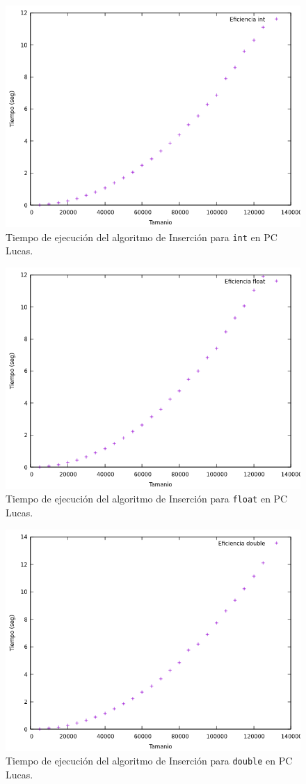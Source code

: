 \documentclass[12pt]{article}
\begin{document}
    \begin{figure}
        \centering
        \includegraphics[width=0.8\linewidth]{images/Insercion/insercion_int_graf.png}
        \cprotect\caption{Tiempo de ejecución del algoritmo de Inserción para \verb|int| en PC Lucas.}
        \label{fig:Inserción_int_graf}
    \end{figure}
    \begin{figure}
        \centering
        \includegraphics[width=0.8\linewidth]{images/Insercion/insercion_float_graf.png}
        \cprotect\caption{Tiempo de ejecución del algoritmo de Inserción para \verb|float| en PC Lucas.}
        \label{fig:Inserción_float_graf}
    \end{figure}
    \begin{figure}
        \centering
        \includegraphics[width=0.8\linewidth]{images/Insercion/insercion_double_graf.png}
        \cprotect\caption{Tiempo de ejecución del algoritmo de Inserción para \verb|double| en PC Lucas.}
        \label{fig:Inserción_double_graf}
    \end{figure}
\end{document}
